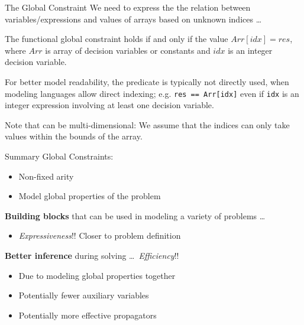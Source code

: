 \documentclass{cons-beamer}
\begin{document}
\begin{frame}{The  Global Constraint}
  We need to express the the relation between variables/expressions and values of arrays based on unknown indices \dots

  \begin{definition}
    The  functional global constraint holds if and only if the value $Arr[idx] = res$, where $Arr$ is array of decision variables or constants and $idx$ is an integer \alert{decision variable}.
  \end{definition}\vfill
  
  \alert{For better model readability}, the  predicate is typically not directly used,
  when modeling languages allow direct indexing; e.g. \texttt{res == Arr[idx]}
  even if \texttt{idx} is an integer expression involving at least one decision variable.
  \vfill

  Note that  can be multi-dimensional: 
  We assume that the indices can only take values \alert{within the bounds of the array.}
\end{frame}


\begin{frame}{Summary}
  Global Constraints:
  \begin{itemize}
    \item Non-fixed arity
    \item Model global properties of the problem
  \end{itemize}
  \vfill

  \textbf{Building blocks} that can be used in modeling a variety of problems \dots
  \begin{itemize}
    \item \textit{Expressiveness}!! Closer to problem definition
  \end{itemize}
  \vfill

  \textbf{Better inference} during solving \dots ~\textit{Efficiency}!!
  \begin{itemize}
    \item Due to modeling global properties together
    \item Potentially fewer auxiliary variables
    \item Potentially more effective propagators
  \end{itemize}
\end{frame}
\end{document}
